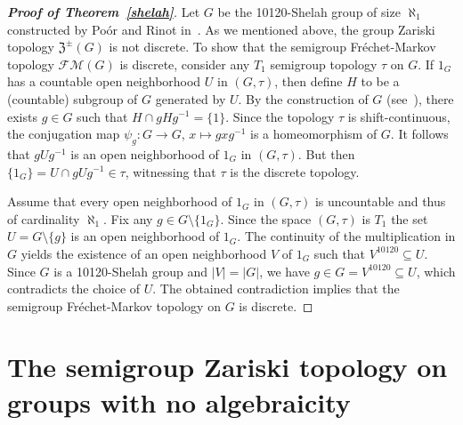 \documentclass[11pt]{amsart}
\theoremstyle{definition}
\begin{document}
\begin{proof}[{\bf Proof of Theorem~\ref{shelah}}] 
Let $G$ be the 10120-Shelah group of size $\aleph_1$ constructed by Poór and Rinot in~\cite{PR}. As we mentioned above, the group Zariski topology $\mathfrak{Z}^{\pm}(G)$ is not discrete. %
To show that the semigroup Fr\'{e}chet-Markov topology $\mathcal {FM}(G)$ is discrete, consider any $T_1$ semigroup topology $\tau$ on $G$. If $1_G$ has a countable open neighborhood $U$ in $(G,\tau)$, then define $H$ to be a (countable) subgroup of $G$ generated by $U$. By the construction of $G$ (see~\cite{PR}), there exists $g\in G$ such that $H\cap gHg^{-1}=\{1\}$. Since the topology $\tau$ is shift-continuous, the conjugation map $\psi_g: G\rightarrow G$, $x\mapsto gxg^{-1}$ is a homeomorphism of $G$. It follows that $gUg^{-1}$ is an open neighborhood of $1_G$ in $(G,\tau)$. But then $\{1_G\}=U\cap gUg^{-1}\in\tau$, witnessing that $\tau$ is the discrete topology. 

Assume that every open neighborhood of $1_G$ in $(G,\tau)$ is uncountable and thus of cardinality $\aleph_1$. Fix any $g\in G\setminus \{1_G\}$. Since the space $(G,\tau)$ is $T_1$ the set $U=G\setminus\{g\}$ is an open neighborhood of $1_G$. The continuity of the multiplication in $G$ yields the existence of an open neighborhood $V$ of $1_G$ such that $V^{10120}\subseteq U$. Since $G$ is a 10120-Shelah group and $|V|=|G|$, we have $g\in G=V^{10120}\subseteq U$, which contradicts the choice of $U$. The obtained contradiction implies that the semigroup Fr\'echet-Markov topology on $G$ is discrete.
\end{proof}  


\section{The semigroup Zariski topology on groups with no algebraicity}
\end{document}
